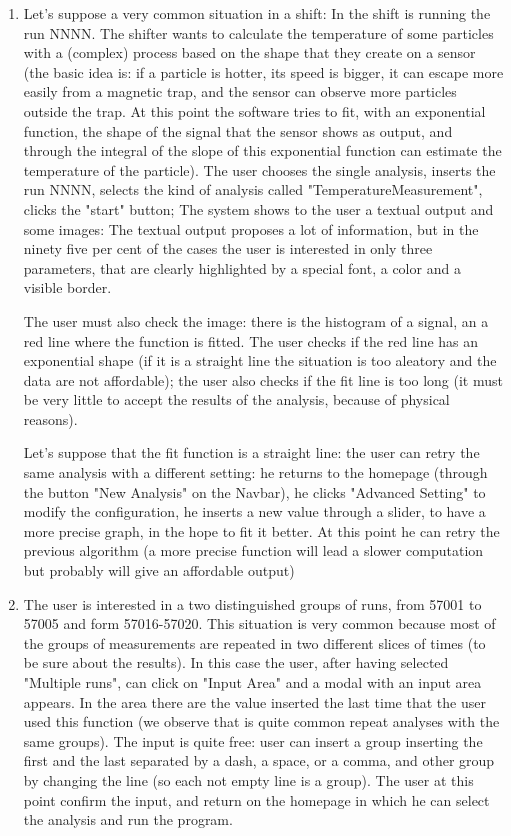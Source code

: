 \begin{enumerate}

\item
Let's suppose a very common situation in a shift: 
In the shift is running the run NNNN. The shifter wants to calculate the temperature of some particles with a (complex) process based on the shape that they create on a sensor (the basic idea is: if a particle is hotter, its speed is bigger, it can escape more easily from a magnetic trap, and the sensor can observe more particles outside the trap. At this point the software tries to fit, with an exponential function, the shape of the signal that the sensor shows as output, and through the integral of the slope of this exponential function can estimate the temperature of the particle).
The user chooses the single analysis, inserts the run NNNN, selects the kind of analysis called "TemperatureMeasurement", clicks the "start" button;
The system shows to the user a textual output and some images: 
The textual output proposes a lot of information, but in the ninety five per cent of the cases the user is interested in only three parameters, that are clearly highlighted by a special font, a color and a visible border. 

The user must also check the image: there is the histogram of a signal, an a red line where the function is fitted. The user checks if the red line
has an exponential shape (if it is a straight line the situation is too aleatory and the data are not affordable); the user also checks if the fit line is too long (it must be very little to accept the results of the analysis, because of physical reasons). 

Let's suppose that the fit function is a straight line: the user can retry the same analysis with a different setting: he returns to the homepage (through the button "New Analysis" on the Navbar), he clicks "Advanced Setting" to modify the configuration, he inserts a new value through a slider, to have a more precise graph, in the hope to fit it better. At this point he can retry the previous algorithm (a more precise function will lead a slower computation but probably will give an affordable output)  

\item 
The user is interested in a two distinguished groups of runs, from 57001 to 57005 and form 57016-57020.
This situation is very common because most of the groups of measurements are repeated in two different slices of times (to be sure about the results).
In this case the user, after having selected "Multiple runs", can click on "Input Area" and a modal with an input area appears. In the area there are the value inserted the last time that the user used this function (we observe that is quite common repeat analyses with the same groups). The input is quite free: user can insert a group inserting the first and the last separated by a dash, a space, or a comma, and other group by changing the line (so each not empty line is a group). 
The user at this point confirm the input, and return on the homepage in which he can select the analysis and run the program. 


\end{enumerate}
